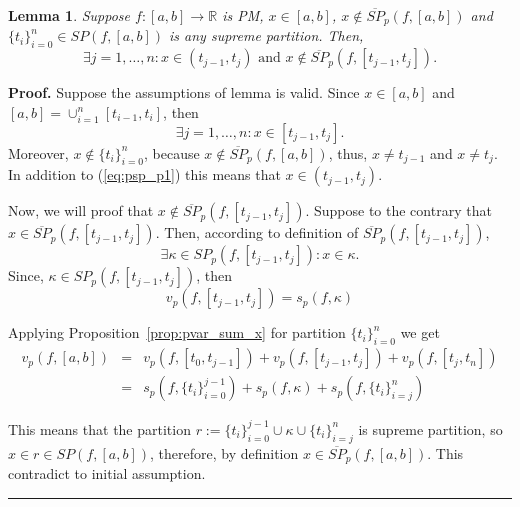 \documentclass[12pt, a4paper]{article}
\newtheorem{lemma}[theorem]{Lemma}
\newenvironment{proof}[1][Proof]{\noindent \textbf{#1.} }{\  \rule{0.5em}{0.5em}}
\numberwithin{equation}{section}
\begin{document}
\begin{lemma}\label{lm:psp} 
  Suppose $f:[a,b] \rightarrow \mathbb{R}$ is PM, 
  $x \in [a,b]$,
  $x \notin \overline{SP}_p(f, [a, b])$ and
  $\{t_i\}_{i=0}^n \in SP(f, [a, b])$ is any supreme partition.
  Then, 
  \begin{equation}
    \exists j=1,\dots,n: x \in (t_{j-1}, t_j) \text{ and } 
    x \notin \overline{SP}_p(f, [t_{j-1}, t_j]).
  \end{equation}
\end{lemma}
\begin{proof}
  Suppose the assumptions of lemma is valid.
  Since $x \in [a,b]$ and $[a, b] = \cup_{i=1}^{n}[t_{i-1}, t_{i}]$,
  then 
  \begin{equation}\label{eq:psp_p1}
    \exists j=1,\dots,n:x \in [t_{j-1}, t_{j}].
  \end{equation}    
  Moreover, $x \notin \{t_i\}_{i=0}^n$, 
  because $x \notin \overline{SP}_p(f, [a, b])$, thus,
  $x \neq t_{j-1}$ and  $x \neq t_{j}$. 
  In addition to (\ref{eq:psp_p1}) this means that 
  $x \in (t_{j-1}, t_{j})$.
    
  Now, we will proof that 
  $x \notin \overline{SP}_p(f, [t_{j-1}, t_j])$.
  Suppose to the contrary that 
  $x \in \overline{SP}_p(f, [t_{j-1}, t_j])$. 
  Then, according to definition of 
  $\overline{SP}_p(f, [t_{j-1}, t_j])$, 
  \begin{equation}
    \exists \kappa \in SP_p(f, [t_{j-1}, t_j]): x \in \kappa.
  \end{equation}    
  Since, $\kappa \in SP_p(f, [t_{j-1}, t_j])$, 
  then 
  \begin{equation}
    v_p(f, [t_{j-1}, t_j])=s_p(f, \kappa)
  \end{equation} 
  
  Applying Proposition~\ref{prop:pvar_sum_x} 
  for partition $\{t_i\}_{i=0}^n$ we get
  \begin{eqnarray}
    v_p(f, [a, b]) &=& v_p(f, [t_{0}, t_{j-1}]) 
     + v_p(f, [t_{j-1}, t_j]) + v_p(f, [t_{j}, t_n])\\
     &=& s_p(f, \{t_i\}_{i=0}^{j-1}) 
     + s_p(f, \kappa) + s_p(f, \{t_i\}_{i=j}^{n}) 
  \end{eqnarray}
   
  This means that the partition 
  $r:=\{t_i\}_{i=0}^{j-1} \cup \kappa \cup \{t_i\}_{i=j}^{n}$
  is supreme partition, so 
  $x \in r \in SP(f, [a, b])$, therefore, by definition
  $x \in \overline{SP}_p(f, [a, b])$. 
  This contradict to initial assumption. 
\end{proof}
\end{document}
